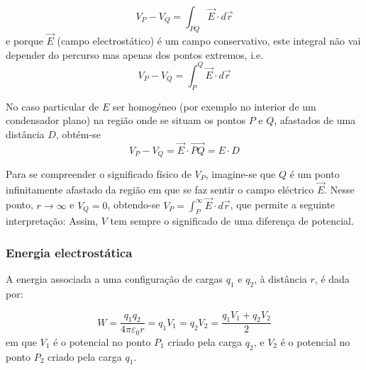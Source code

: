 \documentclass[a4paper,twoside,11pt]{report}      %
\begin{document}
\begin{equation*} 
V_P - V_Q  = \int_{\overline{PQ}}  \vec{E} \cdot d \vec{r}
\end{equation*}
e porque $\vec{E}$ (campo electrostático) é um campo conservativo, este integral não vai depender do percurso mas apenas dos pontos extremos, i.e.
\begin{equation*} 
V_P - V_Q  = \int_P^Q  \vec{E} \cdot d\vec{r}
\end{equation*}


No caso particular de $E$ ser homogéneo (por exemplo no interior de um condensador plano)  na região onde se situam os pontos $P$ e $Q$, afastados de uma distância $D$, obtém-se 
\begin{equation}\label{eq:difPot}
V_P - V_Q  =  \vec{E}\cdot\vec{PQ}=E\cdot D
\end{equation}

Para se compreender o significado físico de $V_P$, imagine-se que $Q$ é um ponto infinitamente
afastado da região em que se faz sentir o campo eléctrico $\vec{E}$.
Nesse ponto, $r \to \infty $ e $V_Q=0$,
obtendo-se $V_P =  \int_P^\infty  \vec{E} \cdot d\vec{r}$, que permite a seguinte interpretação:
\newline
\newline
{}
\newline
\newline
Assim, $V$ tem sempre o significado de uma diferença de potencial.

\subsubsection{{\sf Energia electrostática}}
A energia associada a uma configuração de cargas $q_1$ e $q_2$, à distância $r$, é dada por:

\begin{equation}\label{eq:enrPot}
 W = \frac{q_1 q_2}{4 \pi \varepsilon_0 r} = q_1 V_1 = q_2 V_2 =  \frac{q_1 V_1 +q_2 V_2}{2} 
\end{equation}
em que $V_1$ é o potencial no ponto $P_1$ criado pela carga $q_2$, e $V_2$ é o potencial no ponto $P_2$ criado pela carga $q_1$. 
\end{document}
